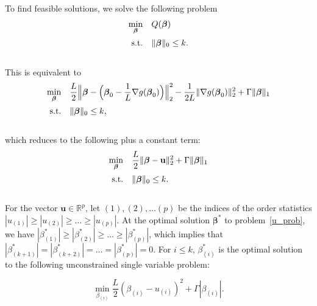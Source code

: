 \documentclass[12pt]{article}
\newcommand{\M}{\mathbf}
\newcommand{\MS}{\boldsymbol}
\newcommand{\R}{\mathbb{R}}
\newcommand{\1}{\mathds{1}}
\begin{document}
To find feasible solutions, we solve the following problem
\begin{equation}
\begin{array}{rll}
  \min \limits_{\MS \beta} & Q(\MS \beta) \vspace{5pt}\\
  \text{s.t.} & \| \MS \beta \|_0 \le k.
\end{array}
\end{equation}\\

This is equivalent to
\begin{equation}
\begin{array}{rll}
  \min \limits_{\MS \beta} & \displaystyle \frac{L}{2}\Big\|\MS \beta - \Big(\MS \beta_0 - \frac{1}{L} \nabla g(\MS \beta_0)\Big) \Big\|_2^2 - \frac{1}{2L} \|\nabla g(\MS \beta_0) \|_2^2 + \Gamma \| \MS \beta \|_1 \vspace{5pt}\\
  \text{s.t.} & \| \MS \beta \|_0 \le k,
\end{array}
\end{equation}\\

which reduces to the following plus a constant term:
\begin{equation}
\label{u_prob}
\begin{array}{rll}
  \min \limits_{\MS \beta} & \displaystyle \frac{L}{2}\|\MS \beta - \M u \|_2^2 + \Gamma \| \MS \beta \|_1 \vspace{5pt}\\
  \text{s.t.} & \| \MS \beta \|_0 \le k.
\end{array}
\end{equation}\\

For the vector $\M u \in \R^p$, let $(1), (2), \ldots (p)$ be the indices of the order statistics $|u_{(1)}| \ge |u_{(2)}| \ge \ldots \ge |u_{(p)}|$.  At the optimal solution $\MS \beta^*$ to problem~\ref{u_prob}, we have $|\beta_{(1)}^*| \ge |\beta_{(2)}^*| \ge \ldots \ge |\beta_{(p)}^*|$, which implies that $|\beta_{(k+1)}^*| = |\beta_{(k + 2)}^*| = \ldots = |\beta_{(p)}^*| = 0$.  For $i \le k$, $\beta_{(i)}^*$ is the optimal solution to the following unconstrained single variable problem:

\begin{equation}
\label{eq:1var}
\min \limits_{\beta_{(i)}} \frac{L}{2}(\beta_{(i)} - u_{(i)})^2 + \Gamma |\beta_{(i)} |.
\end{equation}\\
\end{document}
